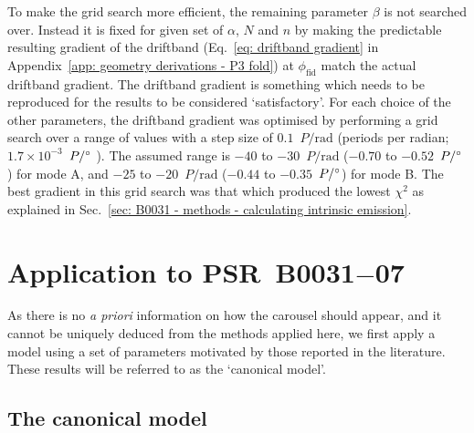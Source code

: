 To make the grid search more efficient, the remaining parameter $\beta$ is not searched over. Instead it is fixed for given set of $\alpha$, $N$ and $n$ by making the predictable resulting gradient of the driftband (Eq.~\eqref{eq: driftband gradient} in Appendix~\ref{app: geometry derivations - P3 fold}) at $\phi_\mathrm{fid}$ match the actual driftband gradient. The driftband gradient is something which needs to be reproduced for the results to be considered `satisfactory'. For each choice of the other parameters, the driftband gradient was optimised by performing a grid search over a range of values with a step size of $0.1$~$P/\text{rad}$ (periods per radian; $1.7\times10^{-3}$~$P/^\circ$ ). The assumed range is $-40$ to $-30$~$P/\text{rad}$ ($-0.70$ to $-0.52$~$P/^\circ$) for mode A, and $-25$ to $-20$~$P/\text{rad}$ ($-0.44$ to $-0.35$~$P/^\circ$) for mode B. The best gradient in this grid search was that which produced the lowest $\chi^2$ as explained in Sec.~\ref{sec: B0031 - methods - calculating intrinsic emission}.














\section{Application to \texorpdfstring{PSR~B0031$-$07}{PSR~B0031--07}}
\label{sec: B0031 - results}

As there is no \textit{a priori} information on how the carousel should appear, and it cannot be uniquely deduced from the methods applied here, we first apply a model using a set of parameters motivated by those reported in the literature. These results will be referred to as the `canonical model'. 

\subsection{The canonical model}
\label{sec: B0031 - results - literature}

